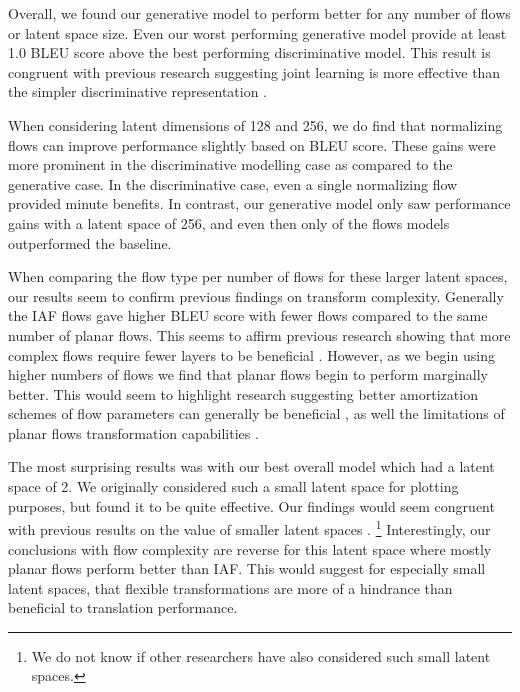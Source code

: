 Overall, we found our generative model to perform better for any number of flows or latent space size. Even our worst performing generative model provide at least 1.0 BLEU score above the best performing discriminative model. This result is congruent with previous research suggesting joint learning is more effective than the simpler discriminative representation \cite{eikema2018AEVNMT}.

When considering latent dimensions of 128 and 256, we do find that normalizing flows can improve performance slightly based on BLEU score. These gains were more prominent in the discriminative modelling case as compared to the generative case. In the discriminative case, even a single normalizing flow provided minute benefits. In contrast, our generative model only saw performance gains with a latent space of 256, and even then only of the flows models outperformed the baseline. 

When comparing the flow type per number of flows for these larger latent spaces, our results seem to confirm previous findings on transform complexity. Generally the \ac{IAF} flows gave higher BLEU score with fewer flows compared to the same number of planar flows. This seems to affirm previous research showing that more complex flows require fewer layers to be beneficial \cite{kingma2016IAF,Berg2018SylvesterNF}. However, as we begin using higher numbers of flows we find that planar flows begin to perform marginally better. This would seem to highlight research suggesting better amortization schemes of flow parameters can generally be beneficial \cite{Berg2018SylvesterNF}, as well the limitations of planar flows transformation capabilities \cite{rezende2015VIwithNF,Berg2018SylvesterNF}.

The most surprising results was with our best overall model which had a latent space of 2. We originally considered such a small latent space for plotting purposes, but found it to be quite effective. Our findings would seem congruent with previous results on the value of smaller latent spaces \cite{schulz2018StochasticDecoder}. \footnote{We do not know if other researchers have also considered such small latent spaces. } Interestingly, our conclusions with flow complexity are reverse for this latent space where mostly planar flows perform better than \ac{IAF}. This would suggest for especially small latent spaces, that flexible transformations are more of a hindrance than beneficial to translation performance. 



